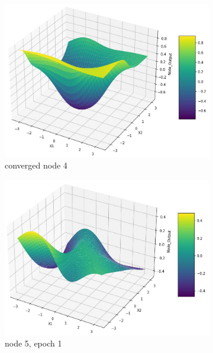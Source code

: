 \documentclass[11pt]{article}
\begin{document}
\begin{figure}[h!]
\begin{subfigure}[b]{0.45\textwidth}
	\includegraphics[scale=0.14]{hidden2_n4_c.jpg}
	\caption{converged node 4}
	\label{fig:fig2.1.7.5}
	\end{subfigure}
	\begin{subfigure}[b]{0.3\textwidth}
	\centering
	\includegraphics[scale=0.14]{hidden2_n5_e1.jpg}
	\caption{node 5, epoch 1}
	\label{fig:fig2.1.7.6}
	\end{subfigure}
	\begin{subfigure}[b]{0.3\textwidth}
	\centering

\end{subfigure}
\end{figure}
\end{document}
